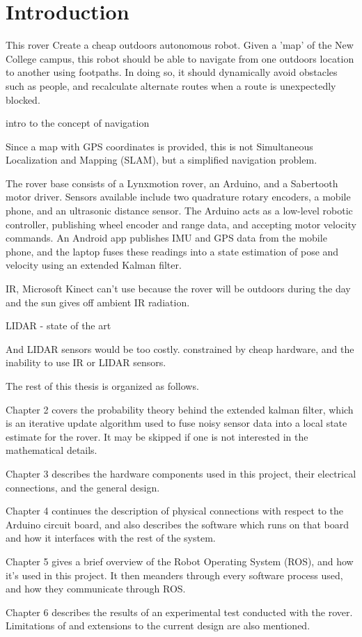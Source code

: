 \chapter*{Introduction}

This rover 
Create a cheap outdoors autonomous robot. Given a 'map' of the New College campus, this robot should be able to navigate from one outdoors location to another using footpaths. In doing so, it should dynamically avoid obstacles such as people, and recalculate alternate routes when a route is unexpectedly blocked.

intro to the concept of navigation

Since a map with GPS coordinates is provided, this is not Simultaneous Localization and Mapping (SLAM), but a simplified navigation problem. 

The rover base consists of a Lynxmotion rover, an Arduino, and a Sabertooth motor driver. Sensors available include two quadrature rotary encoders, a mobile phone, and an ultrasonic distance sensor. The Arduino acts as a low-level robotic controller, publishing wheel encoder and range data, and accepting motor velocity commands. An Android app publishes IMU and GPS data from the mobile phone, and the laptop fuses these readings into a state estimation of pose and velocity using an extended Kalman filter.

IR, Microsoft Kinect
can't use because the rover will be outdoors during the day and the sun gives off ambient IR radiation.

LIDAR - state of the art

And LIDAR sensors would be too costly. constrained by cheap hardware, and the inability to use IR or LIDAR sensors.

The rest of this thesis is organized as follows.

Chapter 2 covers the probability theory behind the extended kalman filter, which is an iterative update algorithm used to fuse noisy sensor data into a local state estimate for the rover. It may be skipped if one is not interested in the mathematical details.

Chapter 3 describes the hardware components used in this project, their electrical connections, and the general design.

Chapter 4 continues the description of physical connections with respect to the Arduino circuit board, and also describes the software which runs on that board and how it interfaces with the rest of the system.

Chapter 5 gives a brief overview of the Robot Operating System (ROS), and how it's used in this project. It then meanders through every software process used, and how they communicate through ROS.

Chapter 6 describes the results of an experimental test conducted with the rover. Limitations of and extensions to the current design are also mentioned.

